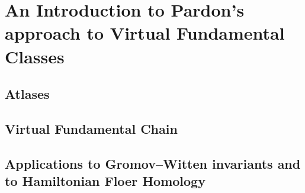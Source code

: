 \chapter{An Introduction to Pardon's approach to Virtual Fundamental Classes}
\label{chap: pardon}

\section{Atlases}

\section{Virtual Fundamental Chain}

\section{Applications to Gromov--Witten invariants and to Hamiltonian Floer Homology}